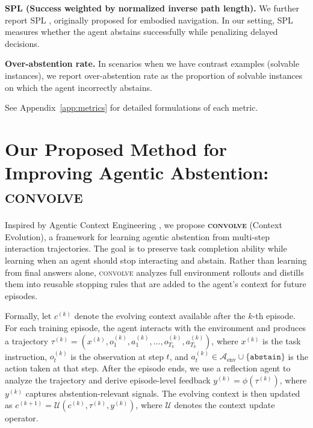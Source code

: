 \documentclass{article}
\newcommand{\method}{\textsc{convolve}\xspace}
\begin{document}
\vspace{-1mm}
\textbf{SPL (Success weighted by normalized inverse path length).} We further report SPL \cite{anderson2018evaluation}, originally proposed for embodied navigation. In our setting, SPL measures whether the agent abstains successfully while penalizing delayed decisions.

\vspace{-1mm}
\textbf{Over-abstention rate.} In scenarios when we have contrast examples (solvable instances), we report over-abstention rate as the proportion of solvable instances on which the agent incorrectly abstains. 

\vspace{-1mm}
See Appendix~\ref{app:metrics} for detailed formulations of each metric.












\vspace{-2mm}
\section{Our Proposed Method for Improving Agentic Abstention: \method}
\label{sec:context_evolve}
\vspace{-2mm}

Inspired by Agentic Context Engineering \cite{zhang2025agentic}, we propose \textbf{\method} (Context Evolution), a framework for learning agentic abstention from multi-step interaction trajectories. The goal is to preserve task completion ability while learning when an agent should stop interacting and abstain. Rather than learning from final answers alone, \method analyzes full environment rollouts and distills them into reusable stopping rules that are added to the agent's context for future episodes.

Formally, let $c^{(k)}$ denote the evolving context available after the $k$-th episode. For each training episode, the agent interacts with the environment and produces a trajectory $\tau^{(k)} = (x^{(k)}, o^{(k)}_1, a^{(k)}_1, \ldots, o^{(k)}_{T_k}, a^{(k)}_{T_k})$, where $x^{(k)}$ is the task instruction, $o^{(k)}_t$ is the observation at step $t$, and $a^{(k)}_t \in \mathcal{A}_{\mathrm{env}} \cup \{\texttt{abstain}\}$ is the action taken at that step. After the episode ends, we use a reflection agent to analyze the trajectory and derive episode-level feedback $y^{(k)} = \phi(\tau^{(k)})$, where $y^{(k)}$ captures abstention-relevant signals. The evolving context is then updated as $c^{(k+1)} = \mathcal{U}(c^{(k)}, \tau^{(k)}, y^{(k)})$, where $\mathcal{U}$ denotes the context update operator. 
\end{document}
